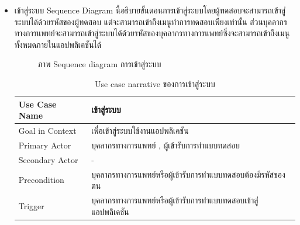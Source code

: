 \documentclass[12pt,oneside,openright,a4paper]{cpe-thai-project}
\begin{document}
\begin{itemize}
\begin{table}[!h]
\begin{tabular}{|p{4cm}|p{10cm}|}
      \end{tabular}
      \end{table}
      \newpage
    \item เข้าสู่ระบบ
    Sequence Diagram นี้อธิบายขั้นตอนการเข้าสู่ระบบโดยผู้ทดสอบจะสามารถเข้าสู่ระบบได้ด้วยรหัสของผู้ทดสอบ
    แต่จะสามารถเข้าถึงเมนูทำการทดสอบเพียงเท่านั้น 
    ส่วนบุคลากรทางการแพทย์จะสามารถเข้าสู่ระบบได้ด้วยรหัสของบุคลากรทางการแพทย์ซึ่งจะสามารถเข้าถึงเมนูทั้งหมดภายในแอปพลิเคชันได้
    \begin{figure}[!ht]\centering
      \setlength{\fboxrule}{0.2mm} %
      \setlength{\fboxsep}{1cm}
      \caption{ภาพ Sequence diagram การเข้าสู่ระบบ}\label{fig:activity4}
     \end{figure}
     \newpage
     \begin{table}[!h]\centering
      \caption{Use case narrative ของการเข้าสู่ระบบ}\label{tbl:application1}
      \begin{tabular}{|p{4cm}|p{10cm}|} \hline
      Use Case Name & เข้าสู่ระบบ \\ \hline
      Goal in Context & เพื่อเข้าสู่ระบบใช้งานแอปพลิเคชัน \\ \hline
      Primary Actor & บุคลากรทางการแพทย์ , ผู้เข้ารับการทำแบบทดสอบ \\ \hline
      Secondary Actor & - \\ \hline
      Precondition & บุคลากรทางการแพทย์หรือผู้เข้ารับการทำแบบทดสอบต้องมีรหัสของตน \\ \hline
      Trigger & บุคลากรทางการแพทย์หรือผู้เข้ารับการทำแบบทดสอบเข้าสู่แอปพลิเคชัน \\ \hline

\end{tabular}
\end{table}
\end{itemize}
\end{document}
